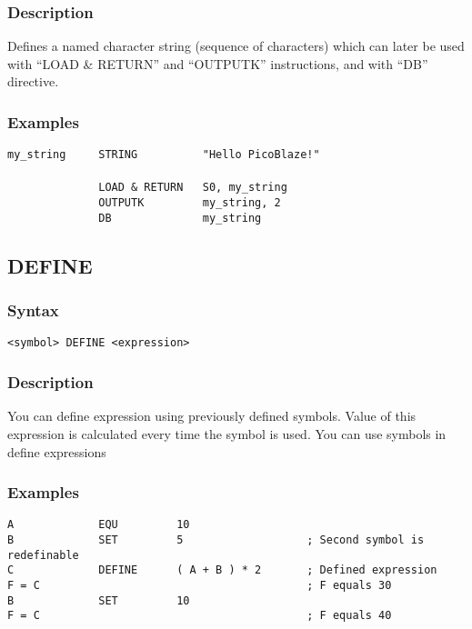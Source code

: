         \subsubsection{Description}
            Defines a named character string (sequence of characters) which can later be used with ``LOAD \& RETURN'' and ``OUTPUTK'' instructions, and with ``DB'' directive.

        \subsubsection{Examples}
            \verb'my_string     STRING          "Hello PicoBlaze!"'\\
            \verb''\\
            \verb'              LOAD & RETURN   S0, my_string'\\
            \verb'              OUTPUTK         my_string, 2'\\
            \verb'              DB              my_string'

    \subsection{DEFINE}
        \subsubsection{Syntax}
            \verb'<symbol> DEFINE <expression>'

        \subsubsection{Description}
            You can define expression using previously defined symbols. Value of this expression is calculated every time the symbol is used. You can use symbols in define expressions

        \subsubsection{Examples}
            \verb'A             EQU         10'\\
            \verb'B             SET         5                   ; Second symbol is redefinable'\\
            \verb'C             DEFINE      ( A + B ) * 2       ; Defined expression'\\
            \verb'F = C                                         ; F equals 30'\\
            \verb'B             SET         10'\\
            \verb'F = C                                         ; F equals 40'

